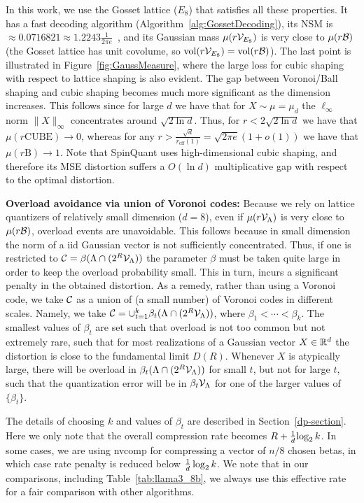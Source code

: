 In this work, we use the Gosset lattice ($E_8$) that satisfies all these properties. It has a fast decoding algorithm (Algorithm~\ref{alg:GossetDecoding}), its NSM is $\approx 0.0716821\approx 1.2243\frac{1}{2\pi e}$~\cite{agrell2023best}, and its Gaussian mass $\mu(r\mathcal{V}_{E_8})$ is very close to $\mu(r \mathcal{B})$ (the Gosset lattice has unit covolume, so $\mathrm{vol}(r\mathcal{V}_{E_8})=\mathrm{vol}(r\mathcal{B})$). The last point is illustrated in Figure~\ref{fig:GaussMeasure}, where the large loss for cubic shaping with respect to lattice shaping is also evident. The gap between Voronoi/Ball shaping and cubic shaping becomes much more significant as the dimension increases. This follows since for large $d$ we have that for $X\sim \mu=\mu_d$ the $\ell_\infty$ norm $\|X\|_{\infty}$ concentrates around $\sqrt{2\ln{d}}$. Thus, for $r<2\sqrt{2\ln{d}}$ we have that $\mu(r\mathrm{CUBE})\to 0$, whereas for any $r>\frac{\sqrt{d}}{r_{\text{eff}}(1)}=\sqrt{2\pi e}(1+o(1))$ we have that $\mu(r\mathrm{B})\to 1$. Note that SpinQuant uses high-dimensional cubic shaping, and therefore its MSE distortion suffers a $O(\ln d)$ multiplicative gap with respect to the optimal distortion.


\textbf{Overload avoidance via union of Voronoi codes:} Because we rely on lattice quantizers of relatively small dimension ($d=8$), even if $\mu(r\mathcal{V}_{\Lambda})$ is very close to $\mu(r\mathcal{B})$, overload events are unavoidable. This follows because in small dimension the norm of a iid Gaussian vector is not sufficiently concentrated. Thus, if one is restricted to $\mathcal{C}=\beta(\Lambda\cap (2^R \mathcal{V}_{\Lambda}))$ the parameter $\beta$ must be taken quite large in order to keep the overload probability small. This in turn, incurs a significant penalty in the obtained distortion. As a remedy, rather than using a Voronoi code, we take $\mathcal{C}$ as a union of (a small number) of Voronoi codes in different scales. Namely, we take $\mathcal{C}=\cup_{t=1}^{k} \beta_t(\Lambda\cap (2^R \mathcal{V}_{\Lambda}))$, where $\beta_1<\cdots<\beta_{k}$. The smallest values of $\beta_t$ are set such that overload is not too common but not extremely rare, such that for most realizations of a Gaussian vector $X\in\mathbb{R}^d$ the distortion is close to the fundamental limit $D(R)$. Whenever $X$ is atypically large, there will be overload in $\beta_t(\Lambda\cap (2^R \mathcal{V}_{\Lambda}))$ for small $t$, but not for large $t$, such that the quantization error will be in $\beta_t \mathcal{V}_{\Lambda}$ for one of the larger values of $\{\beta_t\}$. 

The details of choosing $k$ and values of $\beta_t$ are described in Section~\ref{dp-section}. Here we only note that the overall compression rate becomes $R+{1\over d}{\log_2 k}$. In some cases, we are using nvcomp \cite{nvcomp} for compressing a vector of $n/8$ chosen betas, in which case rate penalty is reduced below ${1\over d}\log_2 k$. We note that in our comparisons, including Table~\ref{tab:llama3_8b}, we always use this effective rate for a fair comparison with 
other algorithms.

